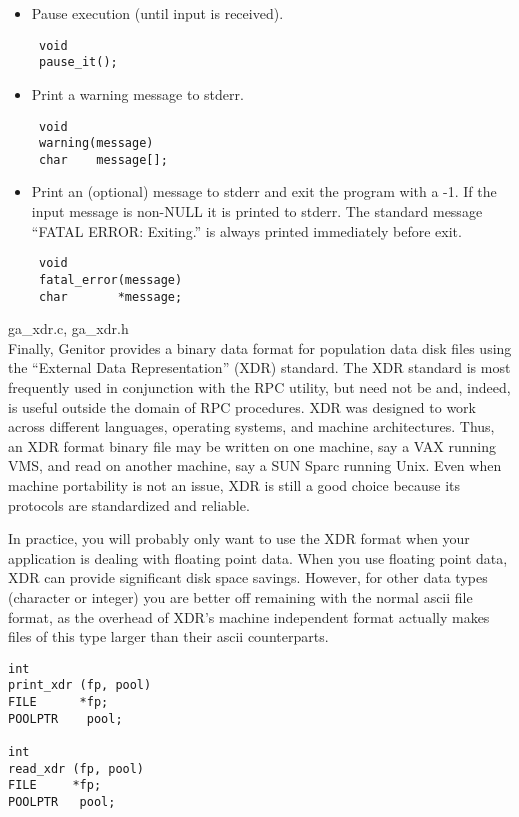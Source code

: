 \begin{itemize}

\item Pause execution (until input is received).
\begin{verbatim}
 void
 pause_it();
\end{verbatim}

\item Print a warning message to stderr. 
\begin{verbatim}
 void
 warning(message)
 char    message[];
\end{verbatim}

\item Print an (optional) message to stderr and exit the program with
a -1.  If the input message is non-NULL it is printed to stderr.  
The standard message ``FATAL ERROR: Exiting.'' is always printed
immediately before exit.
\begin{verbatim}
 void
 fatal_error(message)
 char       *message;
\end{verbatim}

\end{itemize}


ga\_xdr.c, ga\_xdr.h\\
Finally, Genitor provides a binary data format for population data
disk files using the ``External Data Representation'' (XDR) standard. 
The XDR standard is most frequently used in conjunction with the RPC
utility, but need not be and, indeed, is useful outside the domain of RPC
procedures.  XDR was designed to work across different languages, operating
systems, and machine architectures.  Thus, an XDR format binary file may be
written on one machine, say a VAX running VMS, and read on another machine,
say a SUN Sparc running Unix. Even when machine portability is not an issue,
XDR is still a good choice because its protocols are standardized and
reliable.

In practice, you will probably only want to use the XDR format when
your application is dealing with floating point data.  When you use
floating point data, XDR can provide significant disk space savings.
However, for other data types (character or integer) you are better
off remaining with the normal ascii file format, as the overhead of
XDR's machine independent format actually makes files of this type
larger than their ascii counterparts.
\begin{verbatim}
int
print_xdr (fp, pool)
FILE      *fp;
POOLPTR    pool;

int 
read_xdr (fp, pool)
FILE     *fp;
POOLPTR   pool;
\end{verbatim}


